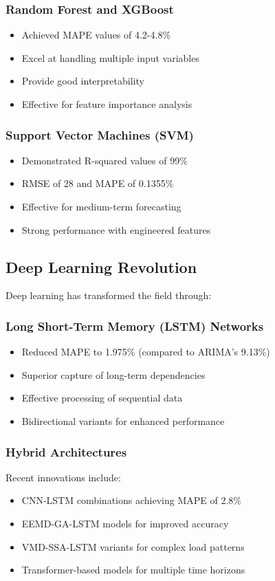 \documentclass[12pt,a4paper]{report}
\begin{document}
\subsubsection{Random Forest and XGBoost}
\begin{itemize}
\item Achieved MAPE values of 4.2-4.8\%
\item Excel at handling multiple input variables
\item Provide good interpretability
\item Effective for feature importance analysis
\end{itemize}

\subsubsection{Support Vector Machines (SVM)}
\begin{itemize}
\item Demonstrated R-squared values of 99\%
\item RMSE of 28 and MAPE of 0.1355\%
\item Effective for medium-term forecasting
\item Strong performance with engineered features
\end{itemize}

\subsection{Deep Learning Revolution}
Deep learning has transformed the field through:

\subsubsection{Long Short-Term Memory (LSTM) Networks}
\begin{itemize}
\item Reduced MAPE to 1.975\% (compared to ARIMA's 9.13\%)
\item Superior capture of long-term dependencies
\item Effective processing of sequential data
\item Bidirectional variants for enhanced performance
\end{itemize}

\subsubsection{Hybrid Architectures}
Recent innovations include:
\begin{itemize}
\item CNN-LSTM combinations achieving MAPE of 2.8\%
\item EEMD-GA-LSTM models for improved accuracy
\item VMD-SSA-LSTM variants for complex load patterns
\item Transformer-based models for multiple time horizons
\end{itemize}
\end{document}
